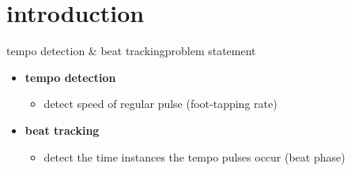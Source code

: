     \section[intro]{introduction}
        \begin{frame}{tempo detection \& beat tracking}{problem statement}
            \begin{itemize}
                \item   \textbf{tempo detection}
                    \begin{itemize}
                        \item   detect speed of regular pulse (foot-tapping rate)
                    \end{itemize}
                \bigskip
                \item   \textbf{beat tracking}
                    \begin{itemize}
                        \item   detect the time instances the tempo pulses occur (beat phase)
                    \end{itemize}
            \end{itemize}
        \end{frame}
        

